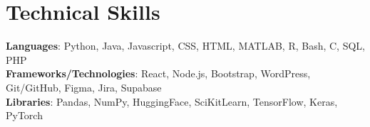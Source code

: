 \section{Technical Skills}
 \begin{itemize}[leftmargin=0.15in, label={}]
    \small{\item{
     \textbf{Languages}{: Python, Java, Javascript, CSS, HTML, MATLAB, R, Bash, C, SQL, PHP} \\
     \textbf{Frameworks/Technologies}{: React, Node.js, Bootstrap, WordPress, Git/GitHub, Figma, Jira, Supabase} \\
     \textbf{Libraries}{: Pandas, NumPy, HuggingFace, SciKitLearn, TensorFlow, Keras, PyTorch}
    }}
 \end{itemize}
